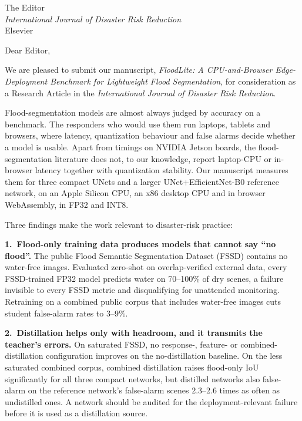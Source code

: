 \documentclass[11pt]{letter}
\begin{document}
\begin{letter}{The Editor\\\emph{International Journal of Disaster Risk Reduction}\\Elsevier}

\opening{Dear Editor,}

We are pleased to submit our manuscript, \emph{FloodLite: A CPU-and-Browser Edge-Deployment Benchmark for Lightweight Flood Segmentation}, for consideration as a Research Article in the \emph{International Journal of Disaster Risk Reduction}.

Flood-segmentation models are almost always judged by accuracy on a benchmark. The responders who would use them run laptops, tablets and browsers, where latency, quantization behaviour and false alarms decide whether a model is usable. Apart from timings on NVIDIA Jetson boards, the flood-segmentation literature does not, to our knowledge, report laptop-CPU or in-browser latency together with quantization stability. Our manuscript measures them for three compact UNets and a larger UNet$+$EfficientNet-B0 reference network, on an Apple Silicon CPU, an x86 desktop CPU and in browser WebAssembly, in FP32 and INT8.

Three findings make the work relevant to disaster-risk practice:

\textbf{1.~Flood-only training data produces models that cannot say ``no flood''.} The public Flood Semantic Segmentation Dataset (FSSD) contains no water-free images. Evaluated zero-shot on overlap-verified external data, every FSSD-trained FP32 model predicts water on 70--100\% of dry scenes, a failure invisible to every FSSD metric and disqualifying for unattended monitoring. Retraining on a combined public corpus that includes water-free images cuts student false-alarm rates to 3--9\%.

\textbf{2.~Distillation helps only with headroom, and it transmits the teacher's errors.} On saturated FSSD, no response-, feature- or combined-distillation configuration improves on the no-distillation baseline. On the less saturated combined corpus, combined distillation raises flood-only IoU significantly for all three compact networks, but distilled networks also false-alarm on the reference network's false-alarm scenes 2.3--2.6 times as often as undistilled ones. A network should be audited for the deployment-relevant failure before it is used as a distillation source.


\end{letter}
\end{document}
